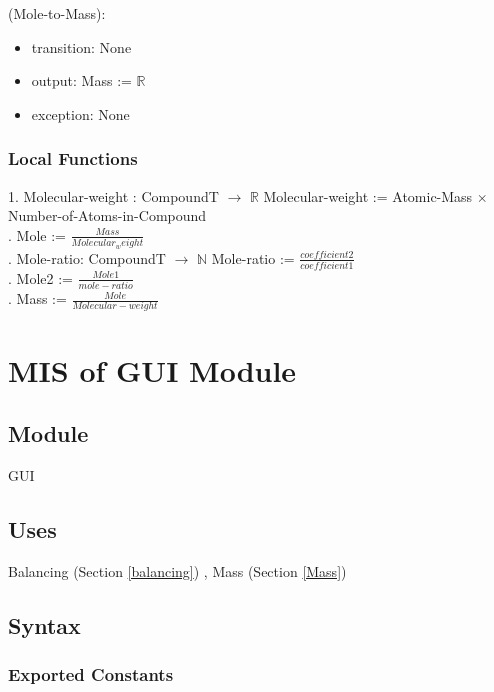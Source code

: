 \documentclass[12pt, titlepage]{article}
\begin{document}
\noindent (Mole-to-Mass):
\begin{itemize}
\item transition: None
\item output:  Mass := $\mathbb{R}$
\item exception: None 
\end{itemize}

\subsubsection{Local Functions}
1. Molecular-weight : CompoundT  $\rightarrow$ $\mathbb{R}$ 
\newline
Molecular-weight := Atomic-Mass $\times$ Number-of-Atoms-in-Compound\\
. Mole := $\frac{Mass}{Molecular_weight}$ \\
. Mole-ratio:  CompoundT $\rightarrow$  $\mathbb{N}$
\newline
Mole-ratio := $\frac{coefficient2}{coefficient1}$\\
. Mole2 := $\frac{Mole1}{mole-ratio}$ \\
. Mass := $\frac{Mole}{Molecular-weight}$
\newpage

\section{MIS of GUI Module} \label{display} 

\subsection{Module}

GUI

\subsection{Uses}

Balancing  (Section \ref{balancing}) , Mass (Section \ref{Mass})


\subsection{Syntax}

\subsubsection{Exported Constants}
\end{document}
